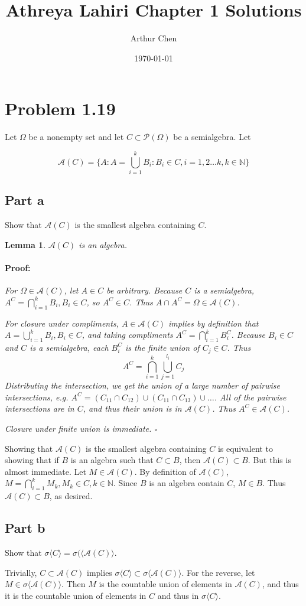 \documentclass{article}
\author{Arthur Chen}
\title{Athreya Lahiri Chapter 1 Solutions}
\date{\today}
\newenvironment{proof}{\paragraph{Proof:}}{\hfill$\square$}
\newtheorem{lemma}[theorem]{Lemma}
\newcommand{\N}{\mathbb{N}}
\begin{document}
\maketitle

\section*{Problem 1.19}

Let $\Omega$ be a nonempty set and let $C \subset \mathcal{P} (\Omega)$ be a semialgebra. Let

\[
\mathcal{A}(C) = \{
A: A=\bigcup_{i=1}^k B_i:B_i \in C, i=1,2 \dots k, k\in \N
\}
\]

\subsection*{Part a}

Show that $\mathcal{A}(C)$ is the smallest algebra containing $C$.

\begin{lemma}
$\mathcal{A}(C)$ is an algebra.
\begin{proof}
For $\Omega \in \mathcal{A}(C)$, let $A\in C$ be arbitrary. Because $C$ is a semialgebra, $A^C = \bigcap_{i=1}^k B_i, B_i \in C$, so $A^C \in C$. Thus $A \cap A^C = \Omega \in \mathcal{A}(C)$.

For closure under compliments, $A \in \mathcal{A}(C)$ implies by definition that $A = \bigcup_{i=1}^k B_i, B_i \in C$, and taking compliments $A^C = \bigcap_{i=1}^k B_i^C$. Because $B_i \in C$ and $C$ is a semialgebra, each $B_i^C$ is the finite union of $C_j \in C$. Thus
\[
A^C = \bigcap_{i=1}^k\bigcup_{j=1}^{l_i}C_j
\]
Distributing the intersection, we get the union of a large number of pairwise intersections, e.g. $A^C = (C_{11}\cap C_{12})\cup(C_{11}\cap C_{13})\cup \dots$. All of the pairwise intersections are in $C$, and thus their union is in $\mathcal{A}(C)$. Thus $A^C \in \mathcal{A}(C)$.

Closure under finite union is immediate. 
\end{proof}
\end{lemma}

Showing that $\mathcal{A}(C)$ is the smallest algebra containing $C$ is equivalent to showing that if $B$ is an algebra such that $C \subset B$, then $\mathcal{A}(C) \subset B$. But this is almost immediate. Let $M \in \mathcal{A}(C)$. By definition of $\mathcal{A}(C)$, $M = \bigcap_{i=1}^k M_k, M_k \in C, k \in \N$. Since $B$ is an algebra contain $C$, $M \in B$. Thus $\mathcal{A}(C) \subset B$, as desired.

\subsection*{Part b}

Show that $\sigma\langle C\rangle = \sigma(\langle \mathcal{A}(C) \rangle$.

Trivially, $C \subset \mathcal{A}(C)$ implies $\sigma\langle C\rangle \subset \sigma\langle \mathcal{A}(C) \rangle$. For the reverse, let $M \in \sigma\langle \mathcal{A}(C) \rangle$. Then $M$ is the countable union of elements in $\mathcal{A}(C)$, and thus it is the countable union of elements in $C$ and thus in $\sigma\langle C\rangle$.
\end{document}
